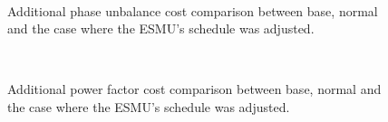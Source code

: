 \begin{figure}\centering
{}\\	
\caption{Additional phase unbalance cost comparison between base, normal and the case where the ESMU's schedule was adjusted.}
\end{figure}

\begin{figure}\centering
{}\\	
\caption{Additional power factor cost comparison between base, normal and the case where the ESMU's schedule was adjusted.}
\end{figure}

